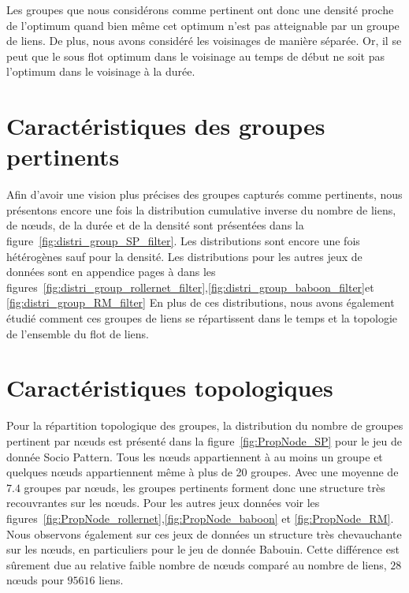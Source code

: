 Les groupes que nous considérons comme pertinent ont donc une densité proche de l'optimum quand bien même cet optimum n'est pas atteignable par un groupe de liens.
De plus, nous avons considéré les voisinages de manière séparée.
Or, il se peut que le sous flot optimum dans le voisinage au temps de début ne soit pas l'optimum dans le voisinage à la durée.


\section{Caractéristiques des groupes pertinents}

Afin d'avoir une vision plus précises des groupes capturés comme pertinents, nous présentons encore une fois la distribution cumulative inverse du nombre de liens, de n\oe uds, de la durée et de la densité sont présentées dans la figure~\ref{fig:distri_group_SP_filter}.
Les distributions sont encore une fois hétérogènes sauf pour la densité.
Les distributions pour les autres jeux de données sont en appendice pages \pageref{fig:distri_group_rollernet_filter} à \pageref{fig:distri_group_RM_filter} dans les figures~\ref{fig:distri_group_rollernet_filter},\ref{fig:distri_group_baboon_filter}et \ref{fig:distri_group_RM_filter}
En plus de ces distributions, nous avons également étudié comment ces groupes de liens se répartissent dans le temps et la topologie de l'ensemble du flot de liens.

\section{Caractéristiques topologiques}
Pour la répartition topologique des groupes, la distribution du nombre de groupes pertinent par n\oe uds est présenté dans la figure~\ref{fig:PropNode_SP} pour le jeu de donnée Socio Pattern.
Tous les n\oe uds appartiennent à au moins un groupe et quelques n\oe uds appartiennent même à plus de 20 groupes.
Avec une moyenne de $7.4$ groupes par n\oe uds, les groupes pertinents forment donc une structure très recouvrantes sur les n\oe uds.
Pour les autres jeux données voir les figures~\ref{fig:PropNode_rollernet},\ref{fig:PropNode_baboon} et \ref{fig:PropNode_RM}.
Nous observons également sur ces jeux de données un structure très chevauchante sur les n\oe uds, en particuliers pour le jeu de donnée Babouin.
Cette différence est sûrement due au relative faible nombre de n\oe uds comparé au nombre de liens, $28$ n\oe uds pour $95616$ liens.


